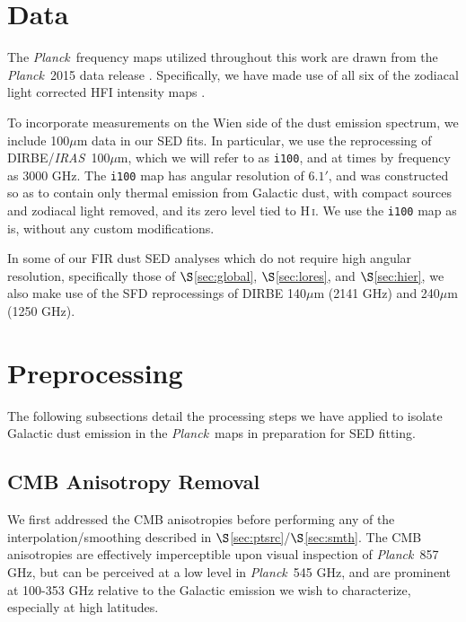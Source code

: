 \documentclass{emulateapj}
\newcommand{\IRAS}{{\it IRAS}}
\newcommand{\PLANCK}{{\it Planck}}
\begin{document}
\section{Data}
\label{sec:data}

The \PLANCK~frequency maps utilized throughout this work are drawn from the 
\PLANCK~2015 data release \citep{planck2015}. Specifically, we have made use 
of all six of the zodiacal light corrected HFI intensity maps
\citep[\texttt{2048\_R2.00\_full\_ZodiCorrected},][]{planckzodi}.

To incorporate measurements on the Wien side of the dust emission spectrum, 
we include 100$\mu$m data in our SED fits. In particular, we use the 
\citet[henceforth SFD]{SFD} reprocessing of DIRBE/\IRAS~100$\mu$m, which we 
will refer to as \verb|i100|, and at times by frequency as 3000 GHz. The 
\verb|i100| map has angular resolution of $6.1'$, and was constructed so as to 
contain only thermal emission from Galactic dust, with compact sources and 
zodiacal light removed, and its zero level tied to H\,\textsc{i}. We use the 
\verb|i100| map as is, without any custom modifications. 

In some of our FIR dust SED analyses which do not require high angular 
resolution, specifically those of $\S$\ref{sec:global}, $\S$\ref{sec:lores}, 
and $\S$\ref{sec:hier}, we also make use of the SFD reprocessings of DIRBE 
140$\mu$m (2141 GHz) and 240$\mu$m (1250 GHz).

\section{Preprocessing}
\label{sec:prepro}

The following subsections detail the processing steps we have applied to 
isolate Galactic dust emission in the \PLANCK~maps in preparation for SED
fitting.

\subsection{CMB Anisotropy Removal}
\label{sec:cmb}

We first addressed the CMB anisotropies before performing any of the 
interpolation/smoothing described in $\S$\ref{sec:ptsrc}/$\S$\ref{sec:smth}. 
The CMB anisotropies are effectively imperceptible upon visual inspection 
of \PLANCK~857 GHz, but can be perceived at a low level in \PLANCK~545 GHz, and
are prominent at 100-353 GHz relative to the Galactic emission
we wish to characterize, especially at high latitudes. 
\end{document}
